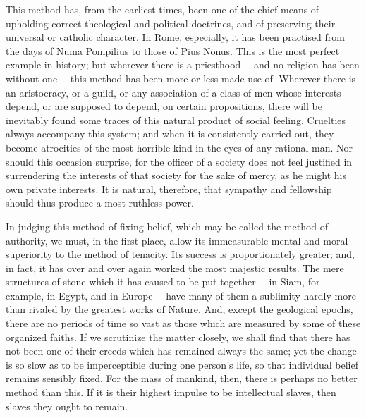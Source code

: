 This method has, from the earliest times, been one of the chief means of upholding correct theological and political doctrines, and of preserving their universal or catholic character. In Rome, especially, it has been practised from the days of Numa Pompilius to those of Pius Nonus. This is the most perfect example in history; but wherever there is a priesthood--- and no religion has been without one--- this method has been more or less made use of. Wherever there is an aristocracy, or a guild, or any association of a class of men whose interests depend, or are supposed to depend, on certain propositions, there will be inevitably found some traces of this natural product of social feeling. Cruelties always accompany this system; and when it is consistently carried out, they become atrocities of the most horrible kind in the eyes of any rational man. Nor should this occasion surprise, for the officer of a society does not feel justified in surrendering the interests of that society for the sake of mercy, as he might his own private interests. It is natural, therefore, that sympathy and fellowship should thus produce a most ruthless power.

In judging this method of fixing belief, which may be called the method of authority, we must, in the first place, allow its immeasurable mental and moral superiority to the method of tenacity. Its success is proportionately greater; and, in fact, it has over and over again worked the most majestic results. The mere structures of stone which it has caused to be put together--- in Siam, for example, in Egypt, and in Europe--- have many of them a sublimity hardly more than rivaled by the greatest works of Nature. And, except the geological epochs, there are no periods of time so vast as those which are measured by some of these organized faiths. If we scrutinize the matter closely, we shall find that there has not been one of their creeds which has remained always the same; yet the change is so slow as to be imperceptible during one person's life, so that individual belief remains sensibly fixed. For the mass of mankind, then, there is perhaps no better method than this. If it is their highest impulse to be intellectual slaves, then slaves they ought to remain.

